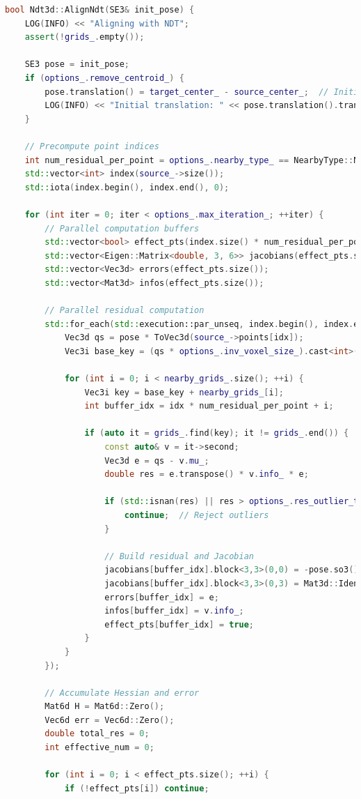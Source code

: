 \begin{lstlisting}[language=c++,caption=src/ch7/ndt\_3d.cc]
bool Ndt3d::AlignNdt(SE3& init_pose) {
	LOG(INFO) << "Aligning with NDT";
	assert(!grids_.empty());
	
	SE3 pose = init_pose;
	if (options_.remove_centroid_) {
		pose.translation() = target_center_ - source_center_;  // Initialize translation
		LOG(INFO) << "Initial translation: " << pose.translation().transpose();
	}
	
	// Precompute point indices
	int num_residual_per_point = options_.nearby_type_ == NearbyType::NEARBY6 ? 7 : 1;
	std::vector<int> index(source_->size());
	std::iota(index.begin(), index.end(), 0);
	
	for (int iter = 0; iter < options_.max_iteration_; ++iter) {
		// Parallel computation buffers
		std::vector<bool> effect_pts(index.size() * num_residual_per_point, false);
		std::vector<Eigen::Matrix<double, 3, 6>> jacobians(effect_pts.size());
		std::vector<Vec3d> errors(effect_pts.size());
		std::vector<Mat3d> infos(effect_pts.size());
		
		// Parallel residual computation
		std::for_each(std::execution::par_unseq, index.begin(), index.end(), [&](int idx) {
			Vec3d qs = pose * ToVec3d(source_->points[idx]);
			Vec3i base_key = (qs * options_.inv_voxel_size_).cast<int>();
			
			for (int i = 0; i < nearby_grids_.size(); ++i) {
				Vec3i key = base_key + nearby_grids_[i];
				int buffer_idx = idx * num_residual_per_point + i;
				
				if (auto it = grids_.find(key); it != grids_.end()) {
					const auto& v = it->second;
					Vec3d e = qs - v.mu_;
					double res = e.transpose() * v.info_ * e;
					
					if (std::isnan(res) || res > options_.res_outlier_th_) {
						continue;  // Reject outliers
					}
					
					// Build residual and Jacobian
					jacobians[buffer_idx].block<3,3>(0,0) = -pose.so3().matrix() * SO3::hat(q);
					jacobians[buffer_idx].block<3,3>(0,3) = Mat3d::Identity();
					errors[buffer_idx] = e;
					infos[buffer_idx] = v.info_;
					effect_pts[buffer_idx] = true;
				}
			}
		});
		
		// Accumulate Hessian and error
		Mat6d H = Mat6d::Zero();
		Vec6d err = Vec6d::Zero();
		double total_res = 0;
		int effective_num = 0;
		
		for (int i = 0; i < effect_pts.size(); ++i) {
			if (!effect_pts[i]) continue;
			

\end{lstlisting}
